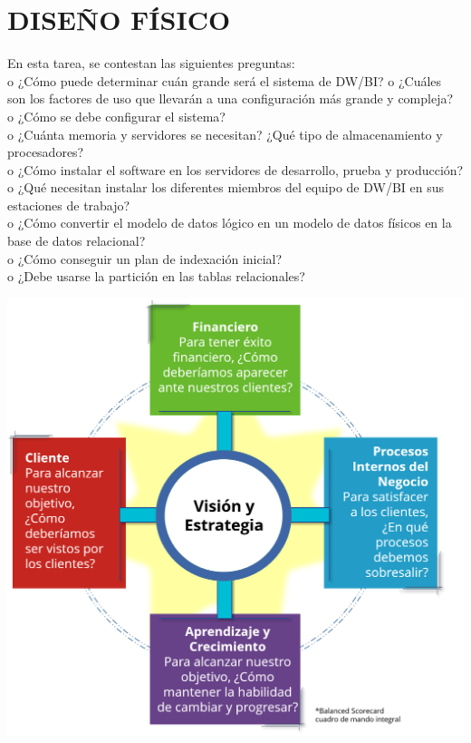\section{DISEÑO FÍSICO}
En esta tarea, se contestan las siguientes preguntas:\\
o	¿Cómo puede determinar cuán grande será el sistema de DW/BI?
o	¿Cuáles son los factores de uso que llevarán a una configuración más grande y compleja?\\
o	¿Cómo se debe configurar el sistema?\\
o	¿Cuánta memoria y servidores se necesitan? ¿Qué tipo de almacenamiento y procesadores?\\
o	¿Cómo instalar el software en los servidores de desarrollo, prueba y producción?\\
o	¿Qué necesitan instalar los diferentes miembros del equipo de DW/BI en sus estaciones de trabajo?\\
o	¿Cómo convertir el modelo de datos lógico en un modelo de datos físicos en la base de datos relacional?\\
o	¿Cómo conseguir un plan de indexación inicial?\\
o	¿Debe usarse la partición en las tablas relacionales?\\



\begin{center}
\includegraphics[width=15cm]{./Imagenes/imagen2}
\end{center}

